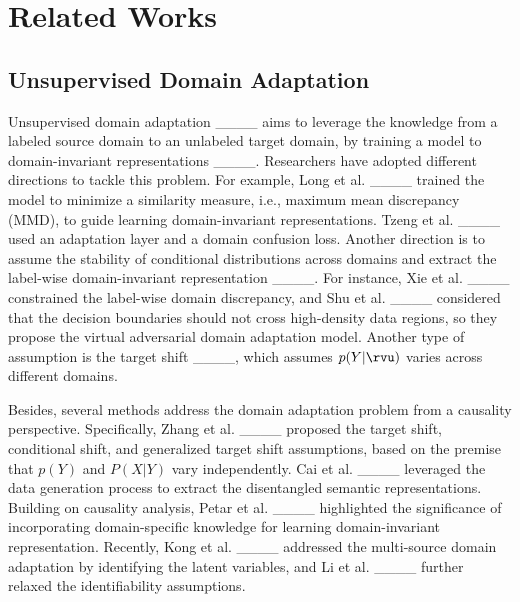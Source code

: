 \section{Related Works}
\label{related_works}




\subsection{Unsupervised Domain Adaptation}
Unsupervised domain adaptation ____ aims to leverage the knowledge from a labeled source domain to an unlabeled target domain, by training a model to domain-invariant representations ____. Researchers have adopted different directions to tackle this problem. For example, Long et al. ____ trained the model to minimize a similarity measure, i.e., maximum mean discrepancy (MMD), to guide learning domain-invariant representations. Tzeng et al. ____ used an adaptation layer and a domain confusion loss. Another direction is to assume the stability of conditional distributions across domains and extract the label-wise domain-invariant representation ____. For instance, Xie et al. ____ constrained the label-wise domain discrepancy, and Shu et al. ____ considered that the decision boundaries should not cross high-density data regions, so they propose the virtual adversarial domain adaptation model. Another type of assumption is the target shift ____, which assumes $p(Y|\rvu)$ varies across different domains. 

Besides, several methods address the domain adaptation problem from a causality perspective. Specifically, Zhang et al. ____ proposed the target shift, conditional shift, and generalized target shift assumptions, based on the premise that $p(Y)$ and $P(X|Y)$ vary independently. Cai et al. ____ leveraged the data generation process to extract the disentangled semantic representations. Building on causality analysis, Petar et al. ____ highlighted the significance of incorporating domain-specific knowledge for learning domain-invariant representation. Recently, Kong et al. ____ addressed the multi-source domain adaptation by identifying the latent variables, and Li et al. ____ further relaxed the identifiability assumptions.


